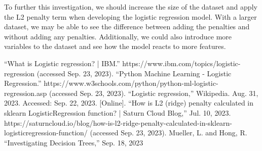 \documentclass[journal]{IEEEtran}
\begin{document}
To further this investigation, we should increase the size of the dataset and apply the L2 penalty term when developing the logistic regression model. With a larger dataset, we may be able to see the difference between adding the penalties and without adding any penalties. Additionally, we could also introduce more variables to the dataset and see how the model reacts to more features. 

\begin{thebibliography}{00}
“What is Logistic regression? | IBM.” https://www.ibm.com/topics/logistic-regression (accessed Sep. 23, 2023).
“Python Machine Learning - Logistic Regression.” https://www.w3schools.com/python/python-ml-logistic-regression.asp (accessed Sep. 23, 2023).
“Logistic regression,” Wikipedia. Aug. 31, 2023. Accessed: Sep. 22, 2023. [Online]. 
“How is L2 (ridge) penalty calculated in sklearn LogisticRegression function? | Saturn Cloud Blog,” Jul. 10, 2023. https://saturncloud.io/blog/how-is-l2-ridge-penalty-calculated-in-sklearn-logisticregression-function/ (accessed Sep. 23, 2023).
Mueller, L. and Hong, R. “Investigating Decision Trees,” Sep. 18, 2023

\end{thebibliography}
\end{document}
